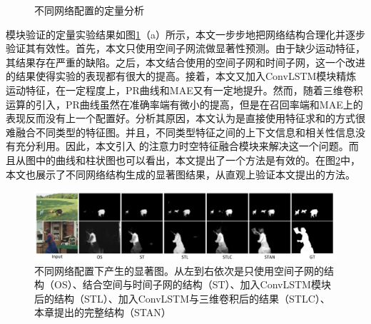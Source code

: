 \begin{figure}
{}
\caption{不同网络配置的定量分析}
\label{diff_config2}
\end{figure}

模块验证的定量实验结果如图\ref{diff_config2}（a）所示，本文一步步地把网络结构合理化并逐步验证其有效性。首先，本文只使用空间子网流做显著性预测。由于缺少运动特征，其结果存在严重的缺陷。之后，本文结合使用的空间子网和时间子网，这一个改进的结果使得实验的表现都有很大的提高。接着，本文又加入ConvLSTM模块精炼运动特征，在一定程度上，PR曲线和MAE又有一定地提升。然而，随着三维卷积运算的引入，PR曲线虽然在准确率端有微小的提高，但是在召回率端和MAE上的表现反而没有上一个配置好。分析其原因，本文认为是直接使用特征求和的方式很难融合不同类型的特征图。并且，不同类型特征之间的上下文信息和相关性信息没有充分利用。因此，本文引入 的注意力时空特征融合模块来解决这一个问题。而且从图中的曲线和柱状图也可以看出，本文提出了一个方法是有效的。在图\ref{config}中，本文也展示了不同网络结构生成的显著图结果，从直观上验证本文提出的方法。

\begin{figure}
\includegraphics[width=1\textwidth]{figures/show_config}
\caption{不同网络配置下产生的显著图。从左到右依次是只使用空间子网的结构（OS）、结合空间与时间子网的结构（ST）、加入ConvLSTM模块后的结构（STL）、加入ConvLSTM与三维卷积后的结果（STLC）、本章提出的完整结构（STAN）}
\label{config}
\end{figure}

